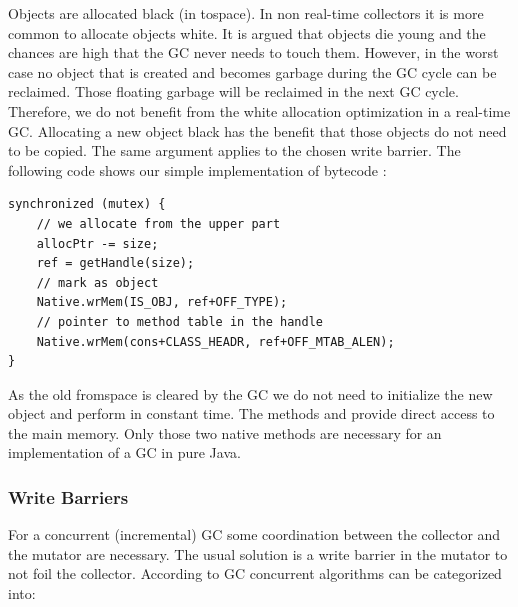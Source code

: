 Objects are allocated black (in tospace). In non real-time
collectors it is more common to allocate objects white. It is argued
\cite{gc:dijkstra78} that objects die young and the chances are high
that the GC never needs to touch them. However, in the worst case no
object that is created and becomes garbage during the GC cycle can
be reclaimed. Those floating garbage will be reclaimed in the next
GC cycle. Therefore, we do not benefit from the white allocation
optimization in a real-time GC. Allocating a new object black has
the benefit that those objects do not need to be copied. The same
argument applies to the chosen write barrier. The following code
shows our simple implementation of bytecode :

\begin{samepage}
{\small
\begin{verbatim}
synchronized (mutex) {
    // we allocate from the upper part
    allocPtr -= size;
    ref = getHandle(size);
    // mark as object
    Native.wrMem(IS_OBJ, ref+OFF_TYPE);
    // pointer to method table in the handle
    Native.wrMem(cons+CLASS_HEADR, ref+OFF_MTAB_ALEN);
}
\end{verbatim}
}
\end{samepage}

As the old fromspace is cleared by the GC we do not need to
initialize the new object and perform  in constant time.
The methods  and  provide
direct access to the main memory. Only those two native methods are
necessary for an implementation of a GC in pure Java.

\subsubsection{Write Barriers}

For a concurrent (incremental) GC some coordination between the
collector and the mutator are necessary. The usual solution is a
write barrier in the mutator to not foil the collector. According to
\cite{gc:wils94} GC concurrent algorithms can be categorized into:

